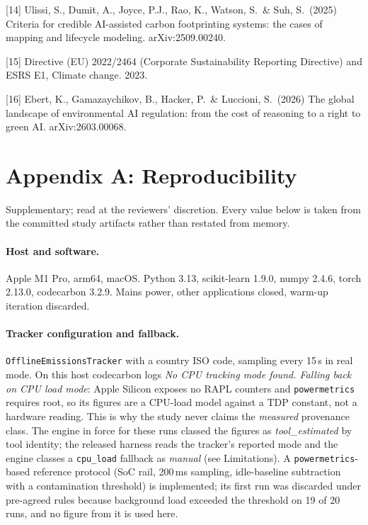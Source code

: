 \documentclass{article}
\begin{document}
[14] Ulissi, S., Dumit, A., Joyce, P.J., Rao, K., Watson, S.\ \& Suh, S.\
(2025) Criteria for credible AI-assisted carbon footprinting systems: the cases
of mapping and lifecycle modeling. arXiv:2509.00240.

[15] Directive (EU) 2022/2464 (Corporate Sustainability Reporting Directive)
and ESRS E1, Climate change. 2023.

[16] Ebert, K., Gamazaychikov, B., Hacker, P.\ \& Luccioni, S.\ (2026) The
global landscape of environmental AI regulation: from the cost of reasoning to
a right to green AI. arXiv:2603.00068.

\appendix
\section*{Appendix A: Reproducibility}

Supplementary; read at the reviewers' discretion. Every value below is taken
from the committed study artifacts rather than restated from memory.

\paragraph{Host and software.} Apple M1 Pro, arm64, macOS. Python 3.13,
scikit-learn 1.9.0, numpy 2.4.6, torch 2.13.0, codecarbon 3.2.9. Mains power,
other applications closed, warm-up iteration discarded.

\paragraph{Tracker configuration and fallback.} \texttt{OfflineEmissionsTracker}
with a country ISO code, sampling every 15\,s in real mode. On this host
codecarbon logs \emph{No CPU tracking mode found. Falling back on CPU load
mode}: Apple Silicon exposes no RAPL counters and \texttt{powermetrics}
requires root, so its figures are a CPU-load model against a TDP constant, not
a hardware reading. This is why the study never claims the \emph{measured}
provenance class. The engine in force for these runs classed the figures as
\emph{tool\_estimated} by tool identity; the released harness reads the
tracker's reported mode and the engine classes a \texttt{cpu\_load} fallback
as \emph{manual} (see Limitations). A \texttt{powermetrics}-based
reference protocol (SoC rail, 200\,ms sampling, idle-baseline subtraction with
a contamination threshold) is implemented; its first run was discarded under
pre-agreed rules because background load exceeded the threshold on 19 of 20
runs, and no figure from it is used here.
\end{document}
